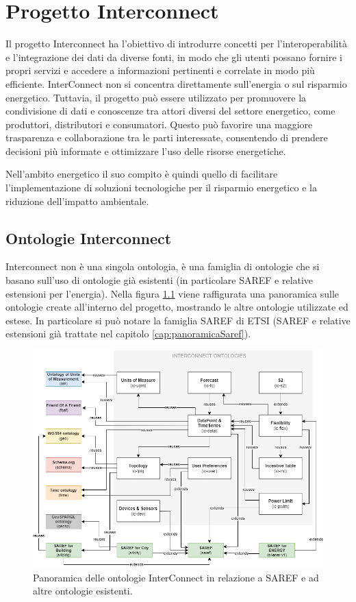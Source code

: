 \chapter{Progetto Interconnect}

Il progetto Interconnect ha l'obiettivo di introdurre concetti per l'interoperabilità e l'integrazione dei dati da diverse fonti, in modo che gli utenti possano fornire i propri servizi e accedere a informazioni pertinenti e correlate in modo più efficiente.
InterConnect non si concentra direttamente sull'energia o sul risparmio energetico. Tuttavia, il progetto può essere utilizzato per promuovere la condivisione di dati e conoscenze tra attori diversi del settore energetico, come produttori, distributori e consumatori. Questo può favorire una maggiore trasparenza e collaborazione tra le parti interessate, consentendo di prendere decisioni più informate e ottimizzare l'uso delle risorse energetiche.

Nell'ambito energetico il suo compito è quindi quello di facilitare l'implementazione di soluzioni tecnologiche per il risparmio energetico e la riduzione dell'impatto ambientale.


\section{Ontologie Interconnect}
Interconnect non è una singola ontologia, è una famiglia di ontologie che si basano sull'uso di ontologie già esistenti (in particolare SAREF e relative estensioni per l'energia).
Nella figura \ref{fig:panoramicaInterconnect} viene raffigurata una panoramica sulle ontologie create all'interno del progetto, mostrando le altre ontologie utilizzate ed estese. In particolare si può notare la famiglia SAREF di ETSI (SAREF e relative estensioni già trattate nel capitolo \ref{cap:panoramicaSaref}).
\begin{figure}[H]
    \centering
    \includegraphics[width=\textwidth]{figures/panoramicaInterconnect.png}
    \caption{Panoramica delle ontologie InterConnect in relazione a SAREF e ad altre ontologie esistenti.}
    \label{fig:panoramicaInterconnect}
\end{figure}


